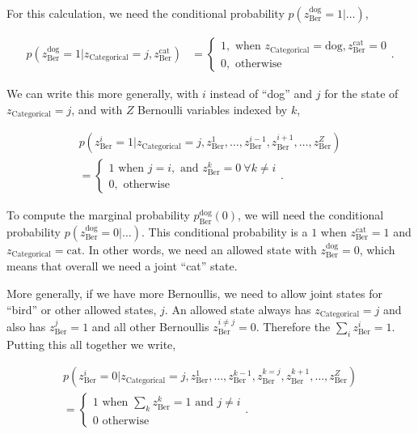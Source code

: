 \documentclass{article}
\begin{document}
For this calculation, we need the conditional probability $p(z^{\text{dog}}_{\text{Ber}}=1 | \ldots)$,  

\begin{align}
        p(z^{\textrm{dog}}_{\text{Ber}}=1|z_{\text{Categorical}}=j, z^{\text{cat}}_{\text{Ber}}) 
        &= \begin{cases}
        1, \text{ when } z_{\text{Categorical}}=\text{dog}, z^{\text{cat}}_{\text{Ber}}=0 \\ 
        0, \text{ otherwise }  
        \end{cases}.
\end{align}

We can write this more generally, with $i$ instead of ``dog'' and $j$ for the state of $z_\text{Categorical} = j$, and with $Z$ Bernoulli variables indexed by $k$,

\begin{align}
        p(z^{i}_{\text{Ber}}=1|z_{\text{Categorical}}=j, z^1_{\text{Ber}}, \ldots, z^{i-1}_{\text{Ber}}, z^{i+1}_{\text{Ber}}, \ldots, z^Z_{\text{Ber}}) \\=
        \begin{cases}
        1 \text{ when } j=i, \text{ and } z^k_{\text{Ber}}=0 \ \forall k \neq i \\ 
        0, \text{ otherwise }  
        \end{cases}.
\end{align}

To compute the marginal probability $p^{\text{dog}}_{\text{Ber}}(0)$, we will need the conditional probability $p(z^{\text{dog}}_{\text{Ber}}=0 | \ldots)$.  This conditional probability is a $1$ when $z^{\text{cat}}_{\text{Ber}}=1$ and $z_{\text{Categorical}} =\text{cat}$.  In other words, we need an allowed state with $z^{\text{dog}}_{\text{Ber}}=0$, which means that overall we need a joint ``cat'' state.  

More generally, if we have more Bernoullis, we need to allow joint states for ``bird'' or other allowed states, $j$.  An allowed state always has $z_{\text{Categorical}} = j$ and also has $z^j_{\text{Ber}}=1$ and all other Bernoullis $z^{i \neq  j}_{\text{Ber}}=0$.  Therefore the $\sum_i z^{i}_{\text{Ber}}=1$.  Putting this all together we write,

\begin{align}
        p(z^{i}_{\text{Ber}}=0|z_{\text{Categorical}}=j, z^1_{\text{Ber}}, \ldots, z^{k-1}_{\text{Ber}},z^{k=j}_{\text{Ber}}, z^{k+1}_{\text{Ber}}, \ldots, z^Z_{\text{Ber}}) 
        \\= 
        \begin{cases}
        1 \text{ when } \sum_{k} z^{k}_{\text{Ber}}=1 \text{ and } j \neq i\\
        0 \text{ otherwise }
        \end{cases}.
\end{align}
\end{document}
